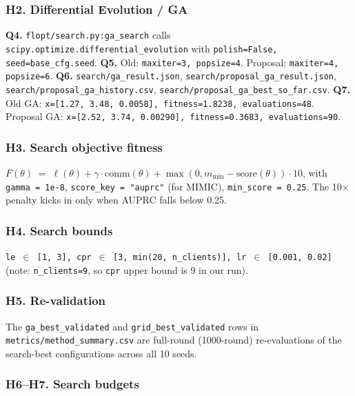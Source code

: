 \documentclass{article}
\begin{document}
\subsubsection{H2. Differential Evolution / GA}


\textbf{Q4.} \texttt{flopt/search.py:ga\_search} calls \texttt{scipy.optimize.differential\_evolution} with \texttt{polish=False, seed=base\_cfg.seed}. \textbf{Q5.} Old: \texttt{maxiter=3, popsize=4}. Proposal: \texttt{maxiter=4, popsize=6}. \textbf{Q6.} \texttt{search/ga\_result.json}, \texttt{search/proposal\_ga\_result.json}, \texttt{search/proposal\_ga\_history.csv}, \texttt{search/proposal\_ga\_best\_so\_far.csv}. \textbf{Q7.} Old GA: \texttt{x=[1.27, 3.48, 0.0058], fitness=1.8238, evaluations=48}. Proposal GA: \texttt{x=[2.52, 3.74, 0.00290], fitness=0.3683, evaluations=90}.


\subsubsection{H3. Search objective fitness}


\(F(\theta) \;=\; \ell(\theta) + \gamma \cdot \text{comm}(\theta) + \max(0, m_{\min} - \text{score}(\theta)) \cdot 10\), with \texttt{gamma = 1e-8}, \texttt{score\_key = "auprc"} (for MIMIC), \texttt{min\_score = 0.25}. The 10\ensuremath{\times} penalty kicks in only when AUPRC falls below 0.25.


\subsubsection{H4. Search bounds}


\texttt{le \ensuremath{\in} [1, 3], cpr \ensuremath{\in} [3, min(20, n\_clients)], lr \ensuremath{\in} [0.001, 0.02]} (note: \texttt{n\_clients=9}, so \texttt{cpr} upper bound is 9 in our run).


\subsubsection{H5. Re-validation}


The \texttt{ga\_best\_validated} and \texttt{grid\_best\_validated} rows in \texttt{metrics/method\_summary.csv} are full-round (1000-round) re-evaluations of the search-best configurations across all 10 seeds.


\subsubsection{H6--H7. Search budgets}
\end{document}

